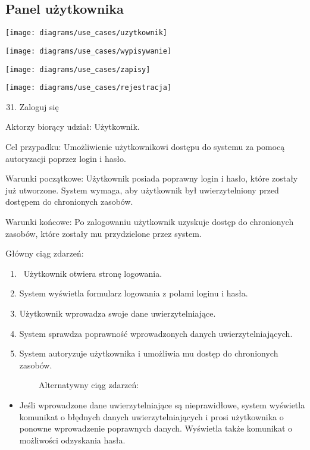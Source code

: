 \subsection{Panel użytkownika}\label{subsec:panel-uzytkownika}

{\texttt{[image: diagrams/use\_cases/uzytkownik]}}

{\texttt{[image: diagrams/use\_cases/wypisywanie]}}

{\texttt{[image: diagrams/use\_cases/zapisy]}}

{\texttt{[image: diagrams/use\_cases/rejestracja]}}

\begin{enumerate}
\setcounter{enumi}{30}
\tightlist
\item
  {Zaloguj się}
\end{enumerate}

{Aktorzy biorący udział: Użytkownik.}

{Cel przypadku: Umożliwienie użytkownikowi dostępu do systemu za pomocą
autoryzacji poprzez login i hasło.}

{Warunki początkowe: Użytkownik posiada poprawny login i hasło, które
zostały już utworzone. System wymaga, aby użytkownik był uwierzytelniony
przed dostępem do chronionych zasobów.}

{Warunki końcowe: Po zalogowaniu użytkownik uzyskuje dostęp do
chronionych zasobów, które zostały mu przydzielone przez system.}

{Główny ciąg zdarzeń:}

\begin{enumerate}
\tightlist
\item
  {~Użytkownik otwiera stronę logowania.}
\item
  {System wyświetla formularz logowania z polami loginu i hasła.}
\item
  {Użytkownik wprowadza swoje dane uwierzytelniające.}
\item
  {System sprawdza poprawność wprowadzonych danych uwierzytelniających.}
\item
  {System autoryzuje użytkownika i umożliwia mu dostęp do chronionych
  zasobów.}
\end{enumerate}

{~~~~~~~~Alternatywny ciąg zdarzeń:}

\begin{itemize}
\tightlist
\item
  {Jeśli wprowadzone dane uwierzytelniające są nieprawidłowe, system
  wyświetla komunikat o błędnych danych uwierzytelniających i prosi
  użytkownika o ponowne wprowadzenie poprawnych danych. Wyświetla także
  komunikat o możliwości odzyskania hasła.\\
  \strut \\
  }
\end{itemize}

